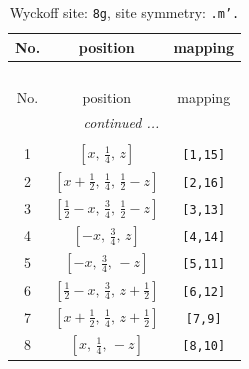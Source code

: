 \documentclass[fleqn,8pt]{jsarticle}
\begin{document}
\begin{longtable}{ccc}
\caption{Wyckoff site: {\tt 8g}, site symmetry: {\tt .m'.}}
 \\
 \hline \hline
No. & position & mapping \\ \hline \endfirsthead

\multicolumn{2}{l}{\tablename\ \thetable{}} \\
 \hline \hline
No. & position & mapping \\ \hline \endhead

 \hline \hline
\multicolumn{2}{r}{\footnotesize\it continued ...} \\ \endfoot

 \hline \hline
\multicolumn{2}{r}{} \\ \endlastfoot

1 & $\left[ x,\, \frac{1}{4},\, z \right]$ & {\tt [1,15]} \\ \hline
2 & $\left[ x + \frac{1}{2},\, \frac{1}{4},\, \frac{1}{2} - z \right]$ & {\tt [2,16]} \\ \hline
3 & $\left[ \frac{1}{2} - x,\, \frac{3}{4},\, \frac{1}{2} - z \right]$ & {\tt [3,13]} \\ \hline
4 & $\left[ - x,\, \frac{3}{4},\, z \right]$ & {\tt [4,14]} \\ \hline
5 & $\left[ - x,\, \frac{3}{4},\, - z \right]$ & {\tt [5,11]} \\ \hline
6 & $\left[ \frac{1}{2} - x,\, \frac{3}{4},\, z + \frac{1}{2} \right]$ & {\tt [6,12]} \\ \hline
7 & $\left[ x + \frac{1}{2},\, \frac{1}{4},\, z + \frac{1}{2} \right]$ & {\tt [7,9]} \\ \hline
8 & $\left[ x,\, \frac{1}{4},\, - z \right]$ & {\tt [8,10]} \\
\end{longtable}
\renewcommand{\arraystretch}{1.2}
\end{document}
